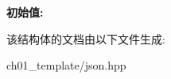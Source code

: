 {\bfseries 初始值\+:}
\begin{DoxyCode}{0}
\DoxyCodeLine{=}

\end{DoxyCode}


该结构体的文档由以下文件生成\+:\begin{DoxyCompactItemize}
\item 
ch01\+\_\+template/json.\+hpp\end{DoxyCompactItemize}

